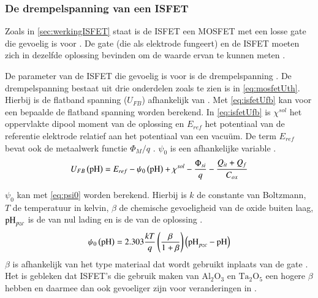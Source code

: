 \subsubsection{De drempelspanning van een ISFET}
Zoals in \cref{sec:werkingISFET} staat is de ISFET een MOSFET met een losse gate die gevoelig is voor \si{\pH} \cite{modeling,isfetAsAnElectronicDevice,bergveld1985impactOfMosfetBasedSensors,bergveld2003thirtyYearsISFET}. De gate (die als elektrode fungeert) en de ISFET moeten zich in dezelfde oplossing bevinden om de \si{\pH} waarde ervan te kunnen meten \cite{modeling,isfetAsAnElectronicDevice,bergveld1985impactOfMosfetBasedSensors,bergveld2003thirtyYearsISFET}.

De parameter van de ISFET die gevoelig is voor \si{\pH} is de drempelspanning \cite{isfetAsAnElectronicDevice,bergveld2003thirtyYearsISFET,bergveld1985impactOfMosfetBasedSensors}. De drempelspanning bestaat uit drie onderdelen zoals te zien is in \cref{eq:mosfetUth}. Hierbij is de flatband spanning ($U_{FB}$) afhankelijk van \si{\pH} \cite{isfetAsAnElectronicDevice,bergveld1985impactOfMosfetBasedSensors,bergveld2003thirtyYearsISFET}. Met \cref{eq:isfetUfb} kan voor een bepaalde \si{\pH} de flatband spanning worden berekend. In \cref{eq:isfetUfb} is $\chi^{sol}$ het oppervlakte dipool moment van de oplossing en $E_{ref}$ het potentiaal van de referentie elektrode relatief aan het potentiaal van een vacuüm. De term $E_{ref}$ bevat ook de metaalwerk functie $\Phi_M/q$ \cite{isfetAsAnElectronicDevice,bergveld2003thirtyYearsISFET,bergveld1985impactOfMosfetBasedSensors}. $\psi_0$ is een \si{\pH} afhankelijke variable \cite{isfetAsAnElectronicDevice,bergveld1985impactOfMosfetBasedSensors,bergveld2003thirtyYearsISFET}.
\begin{equation}\label{eq:isfetUfb}
    U_{FB}\left(\ph\right)=E_{ref}-\psi_0\left(\ph\right)+\chi^{sol}-\frac{\Phi_{si}}{q}-\frac{Q_{it}+Q_f}{C_{ox}}
    \tagaddtext{[\si{\volt}]}
\end{equation}

$\psi_0$ kan met \cref{eq:psi0} worden berekend. Hierbij is $k$ de constante van Boltzmann, $T$ de temperatuur in kelvin, $\beta$ de chemische gevoeligheid van de oxide buiten laag, $\si{\pH}_{pzc}$ is de \si{\pH} van nul lading en \si{\pH} is de \si{\pH} van de oplossing \cite{bergveld2003thirtyYearsISFET,bergveld1985impactOfMosfetBasedSensors}.
\begin{equation}\label{eq:psi0}
    \psi_0\left(\ph\right)=2.303\frac{kT}{q}\left(\frac{\beta}{1+\beta}\right)\left(\ph_{pzc}-\ph\right)
    \tagaddtext{[\si{\volt}]}
\end{equation}
$\beta$ is afhankelijk van het type materiaal dat wordt gebruikt inplaats van de gate \cite{bergveld2003thirtyYearsISFET,bergveld1985impactOfMosfetBasedSensors}. Het is gebleken dat ISFET's die gebruik maken van $\mathrm{Al_{2}O_3}$ en $\mathrm{Ta_2O_5}$ een hogere $\beta$ hebben en daarmee dan ook gevoeliger zijn voor veranderingen in \si{\pH} \cite{bergveld2003thirtyYearsISFET,bergveld1985impactOfMosfetBasedSensors}.


